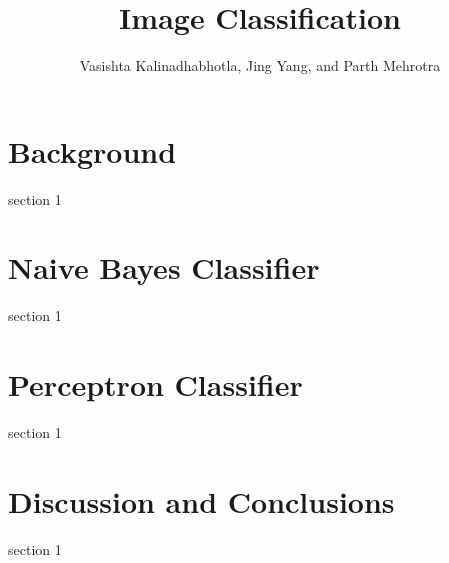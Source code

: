 \documentclass[12pt, letterpaper]{article}
\title{Image Classification}
\author{
  Vasishta Kalinadhabhotla, Jing Yang, and Parth Mehrotra
}
\begin{document}
\maketitle
\section{Background}
section 1
\section{Naive Bayes Classifier}
section 1
\section{Perceptron Classifier}
section 1
\section{Discussion and Conclusions}
section 1
\end{document}
